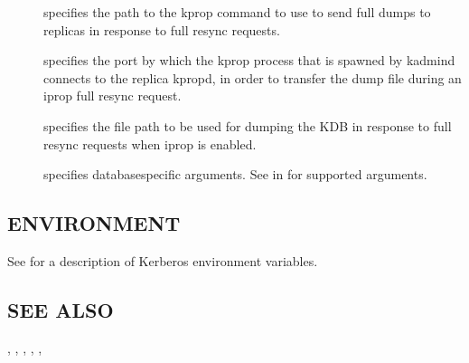 \documentclass[letterpaper,10pt,english]{sphinxmanual}
\begin{document}
\begin{description}
\item[{ }] \leavevmode
\sphinxAtStartPar
specifies the path to the kprop command to use to send full dumps
to replicas in response to full resync requests.

\item[{ }] \leavevmode
\sphinxAtStartPar
specifies the port by which the kprop process that is spawned by
kadmind connects to the replica kpropd, in order to transfer the
dump file during an iprop full resync request.

\item[{ }] \leavevmode
\sphinxAtStartPar
specifies the file path to be used for dumping the KDB in response
to full resync requests when iprop is enabled.

\item[{ }] \leavevmode
\sphinxAtStartPar
specifies database\sphinxhyphen{}specific arguments.  See {\hyperref[\detokenize{admin/admin_commands/kadmin_local:dboptions}]{}} in {\hyperref[\detokenize{admin/admin_commands/kadmin_local:kadmin-1}]{}} for supported arguments.

\end{description}


\subsection{ENVIRONMENT}
\label{\detokenize{admin/admin_commands/kadmind:environment}}
\sphinxAtStartPar
See  for a description of Kerberos environment
variables.


\subsection{SEE ALSO}
\label{\detokenize{admin/admin_commands/kadmind:see-also}}
\sphinxAtStartPar
{}, {\hyperref[\detokenize{admin/admin_commands/kadmin_local:kadmin-1}]{}}, {\hyperref[\detokenize{admin/admin_commands/kdb5_util:kdb5-util-8}]{}},
{\hyperref[\detokenize{admin/admin_commands/kdb5_ldap_util:kdb5-ldap-util-8}]{}}, {\hyperref[\detokenize{admin/conf_files/kadm5_acl:kadm5-acl-5}]{}}, 
\end{document}
